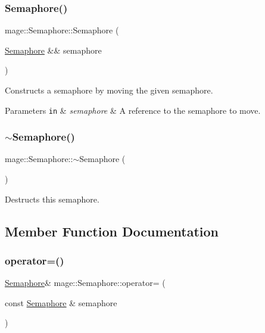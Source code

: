 \subsubsection{\texorpdfstring{Semaphore()}{Semaphore()}\hspace{0.1cm}{\footnotesize\ttfamily [3/3]}}
{\footnotesize\ttfamily mage\+::\+Semaphore\+::\+Semaphore (\begin{DoxyParamCaption}\item[{\hyperlink{structmage_1_1_semaphore}{Semaphore} \&\&}]{semaphore }\end{DoxyParamCaption})\hspace{0.3cm}{\ttfamily [default]}}

Constructs a semaphore by moving the given semaphore.


\begin{DoxyParams}[1]{Parameters}
\mbox{\tt in}  & {\em semaphore} & A reference to the semaphore to move. \\
\hline
\end{DoxyParams}
\hypertarget{structmage_1_1_semaphore_a991ed365c28e4a9c63ff34a5efeb012d}{}\label{structmage_1_1_semaphore_a991ed365c28e4a9c63ff34a5efeb012d} 
\subsubsection{\texorpdfstring{$\sim$\+Semaphore()}{~Semaphore()}}
{\footnotesize\ttfamily mage\+::\+Semaphore\+::$\sim$\+Semaphore (\begin{DoxyParamCaption}{ }\end{DoxyParamCaption})}

Destructs this semaphore. 

\subsection{Member Function Documentation}
\hypertarget{structmage_1_1_semaphore_af3308cf7fa1ed33cda0ee53b9565f658}{}\label{structmage_1_1_semaphore_af3308cf7fa1ed33cda0ee53b9565f658} 
\subsubsection{\texorpdfstring{operator=()}{operator=()}\hspace{0.1cm}{\footnotesize\ttfamily [1/2]}}
{\footnotesize\ttfamily \hyperlink{structmage_1_1_semaphore}{Semaphore}\& mage\+::\+Semaphore\+::operator= (\begin{DoxyParamCaption}\item[{const \hyperlink{structmage_1_1_semaphore}{Semaphore} \&}]{semaphore }\end{DoxyParamCaption})\hspace{0.3cm}{\ttfamily [delete]}}

